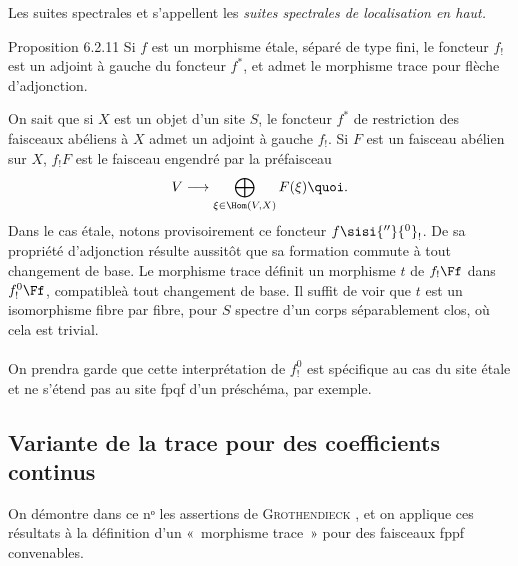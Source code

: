 Les suites spectrales  et  s'appellent les
\emph{suites spectrales de localisation en haut.}

\begin{enonce*}{Proposition 6.2.11}
Si $f$ est un morphisme étale, séparé de type fini, le foncteur
$f_{!}$ est un adjoint à gauche du foncteur $f^{\ast}$, et admet le
morphisme trace pour flèche d'adjonction.
\end{enonce*}

On sait que si $X$ est un objet d'un site $S$, le foncteur $f^{\ast}$
de restriction des faisceaux abéliens à $X$ admet un adjoint à gauche
$f_{!}$. Si $F$ est un faisceau abélien sur $X$, $f_{!}F$ est le
faisceau engendré par la préfaisceau
$$
V\longrightarrow \bigoplus_{\xi \in \Hom(V,X)}F(\xi){\quoi}.
$$
Dans le cas étale, notons provisoirement ce foncteur $f\sisi{''}{^0}_{!}$. De sa
propriété d'adjonction résulte aussitôt que sa formation commute à
tout changement de base. Le morphisme trace définit un morphisme $t$
de $f_{!}\Ff $ dans $f^{0}_{!}\Ff $,
compatible\pageoriginale à tout changement de base. Il suffit de voir
que $t$ est un isomorphisme fibre par fibre, \ie pour $S$ spectre d'un
corps séparablement clos, où cela est trivial.

\setcounter{subsubsection}{11}
\paragraph{}
On prendra garde que cette interprétation de $f^{0}_{!}$ est
spécifique au cas du site étale et ne s'étend pas au site fpqf d'un
préschéma, par exemple.

\subsection{Variante de la trace pour des coefficients continus}

On démontre dans ce nᵒ les assertions de \textsc{Grothendieck}
\cite[nᵒ 6]{Gr}, et on applique ces résultats à la définition
d'un « morphisme trace » pour des faisceaux fppf convenables.

